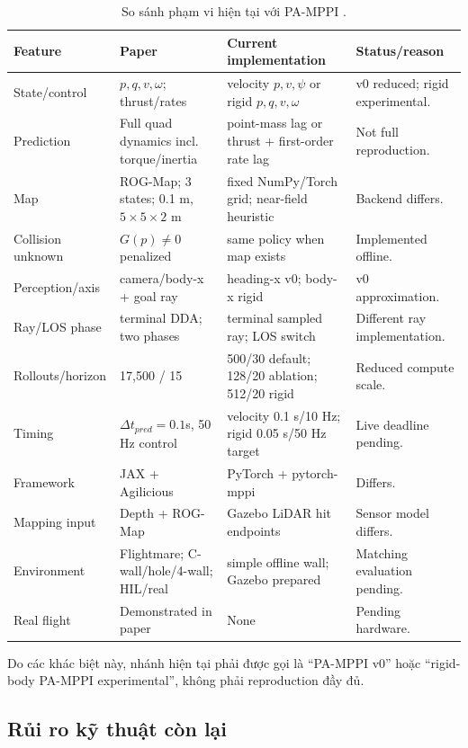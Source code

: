 \documentclass[11pt,a4paper]{article}
\begin{document}
\begin{table}[ht]
\centering
\caption{So sánh phạm vi hiện tại với PA-MPPI \cite{zhai2026pamppi}.}
\footnotesize
\begin{tabularx}{\textwidth}{L{0.18\textwidth}L{0.29\textwidth}L{0.31\textwidth}Y}
\toprule
\textbf{Feature} & \textbf{Paper} & \textbf{Current implementation} & \textbf{Status/reason} \\
\midrule
State/control & $p,q,v,\omega$; thrust/rates & velocity $p,v,\psi$ or rigid $p,q,v,\omega$ & v0 reduced; rigid experimental.\\
Prediction & Full quad dynamics incl. torque/inertia & point-mass lag or thrust + first-order rate lag & Not full reproduction.\\
Map & ROG-Map; 3 states; 0.1 m, $5\times5\times2$ m & fixed NumPy/Torch grid; near-field heuristic & Backend differs.\\
Collision unknown & $G(p)\neq0$ penalized & same policy when map exists & Implemented offline.\\
Perception/axis & camera/body-x + goal ray & heading-x v0; body-x rigid & v0 approximation.\\
Ray/LOS phase & terminal DDA; two phases & terminal sampled ray; LOS switch & Different ray implementation.\\
Rollouts/horizon & 17,500 / 15 & 500/30 default; 128/20 ablation; 512/20 rigid & Reduced compute scale.\\
Timing & $\Delta t_{pred}=0.1$s, 50 Hz control & velocity 0.1 s/10 Hz; rigid 0.05 s/50 Hz target & Live deadline pending.\\
Framework & JAX + Agilicious & PyTorch + pytorch-mppi & Differs.\\
Mapping input & Depth + ROG-Map & Gazebo LiDAR hit endpoints & Sensor model differs.\\
Environment & Flightmare; C-wall/hole/4-wall; HIL/real & simple offline wall; Gazebo prepared & Matching evaluation pending.\\
Real flight & Demonstrated in paper & None & Pending hardware.\\
\bottomrule
\end{tabularx}
\end{table}

Do các khác biệt này, nhánh hiện tại phải được gọi là ``PA-MPPI v0'' hoặc
``rigid-body PA-MPPI experimental'', không phải reproduction đầy đủ.

\subsection{Rủi ro kỹ thuật còn lại}
\end{document}
